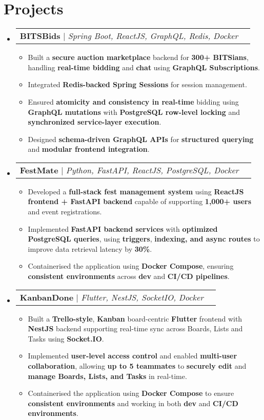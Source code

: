 \documentclass[letterpaper,9pt]{article}
\makeatletter
\newcommand{\resumeItem}[1]{\item\small{#1}}
\newcommand{\resumeProjectHeading}[2]{
    \item
    \begin{tabular*}{0.97\textwidth}{l@{\extracolsep{\fill}}r}
      \small#1 & #2 \\
    \end{tabular*}\vspace{-7pt}
}
\newcommand{\resumeSubHeadingListStart}{\begin{itemize}[leftmargin=*]}
\newcommand{\resumeSubHeadingListEnd}{\end{itemize}}
\newcommand{\resumeItemListStart}{\begin{itemize}}
\newcommand{\resumeItemListEnd}{\end{itemize}\vspace{-5pt}}
\makeatother
\begin{document}
\section{Projects}
\resumeSubHeadingListStart
    \resumeProjectHeading
        {\textbf{BITSBids} $|$ \emph{Spring Boot, ReactJS, GraphQL, Redis, Docker}}{}
      \resumeItemListStart
        \resumeItem{
            Built a \textbf{secure auction marketplace} backend for \textbf{300+ BITSians}, handling \textbf{real-time bidding} and \textbf{chat} using \textbf{GraphQL Subscriptions}.
        }
        \resumeItem{
            Integrated \textbf{Redis-backed Spring Sessions} for session management.
        }
        \resumeItem{
            Ensured \textbf{atomicity and consistency in real-time} bidding using \textbf{GraphQL mutations} with \textbf{PostgreSQL row-level locking} and \textbf{synchronized service-layer execution}.
        }
        \resumeItem{
            Designed \textbf{schema-driven GraphQL APIs} for \textbf{structured querying} and \textbf{modular frontend integration}.
        }
      \resumeItemListEnd

  \resumeProjectHeading
    {\textbf{FestMate} $|$ \emph{Python, FastAPI, ReactJS, PostgreSQL, Docker}}{}
  \resumeItemListStart
    \resumeItem{
        Developed a \textbf{full-stack fest management system} using \textbf{ReactJS frontend + FastAPI backend} capable of supporting \textbf{1,000+ users} and event registrations. 
    }
    \resumeItem{
        Implemented \textbf{FastAPI backend services} with \textbf{optimized PostgreSQL queries}, using \textbf{triggers}, \textbf{indexing, and async routes} to improve data retrieval latency by \textbf{30\%}.
    }
    \resumeItem{
        Containerised the application using \textbf{Docker Compose}, ensuring \textbf{consistent environments} across \textbf{dev} and \textbf{CI/CD pipelines}. 
    }
  \resumeItemListEnd

   \resumeProjectHeading
    {\textbf{KanbanDone} $|$ \emph{Flutter, NestJS, SocketIO, Docker}}{}
  \resumeItemListStart
    \resumeItem{
        Built a \textbf{Trello-style}, \textbf{Kanban} board-centric \textbf{Flutter} frontend with \textbf{NestJS} backend supporting real-time sync across Boards, Lists and Tasks using \textbf{Socket.IO}.
    }
    \resumeItem{
        Implemented \textbf{user-level access control} and enabled \textbf{multi-user collaboration}, allowing \textbf{up to 5 teammates} to \textbf{securely edit} and \textbf{manage Boards, Lists, and Tasks} in real-time.
    }
    \resumeItem{
        Containerised the application using \textbf{Docker Compose} to ensure \textbf{consistent environments} and working in both \textbf{dev} and \textbf{CI/CD environments}.
    }
  \resumeItemListEnd
\resumeSubHeadingListEnd
\end{document}

